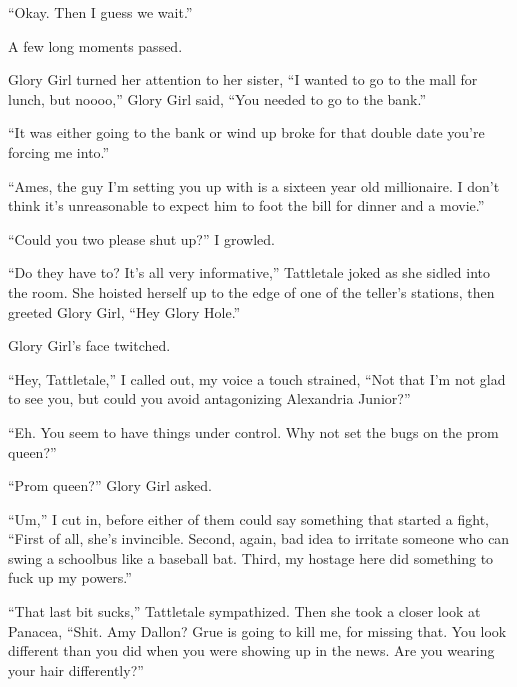 ``Okay.  Then I guess we wait.''



A few long moments passed.



Glory Girl turned her attention to her sister, ``I wanted to go to the mall for lunch, but noooo,'' Glory Girl said, ``You needed to go to the bank.''



``It was either going to the bank or wind up broke for that double date you're forcing me into.''



``Ames, the guy I'm setting you up with is a sixteen year old millionaire.  I don't think it's unreasonable to expect him to foot the bill for dinner and a movie.''



``Could you two please shut up?'' I growled.



``Do they have to?  It's all very informative,'' Tattletale joked as she sidled into the room.  She hoisted herself up to the edge of one of the teller's stations, then greeted Glory Girl, ``Hey Glory Hole.''



Glory Girl's face twitched.



``Hey, Tattletale,'' I called out, my voice a touch strained, ``Not that I'm not glad to see you, but could you avoid antagonizing Alexandria Junior?''



``Eh.  You seem to have things under control.  Why not set the bugs on the prom queen?''



``Prom queen?'' Glory Girl asked.



``Um,'' I cut in, before either of them could say something that started a fight, ``First of all, she's invincible.  Second, again, bad idea to irritate someone who can swing a schoolbus like a baseball bat.  Third, my hostage here did something to fuck up my powers.''



``That last bit sucks,'' Tattletale sympathized.  Then she took a closer look at Panacea, ``Shit.  Amy Dallon?  Grue is going to kill me, for missing that.  You look different than you did when you were showing up in the news.  Are you wearing your hair differently?''



